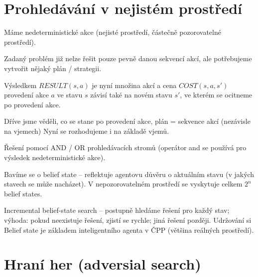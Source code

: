 
\section{Prohledávání v nejistém prostředí}

\begin{compactitem}
    \item Máme nedeterministické akce (nejisté prostředí, částečně pozorovatelné prostředí).

    \item Zadaný problém již nelze řešit pouze pevně danou sekvencí akcí, ale potřebujeme vytvořit nějaký plán / strategii.

    \item Výsledkem $RESULT(s, a)$ je nyní množina akcí a
    cena $COST(s, a, s')$ provedení akce $a$ ve stavu $s$ závisí také na novém stavu $s'$, ve kterém se ocitneme po provedení akce.

    \item Dříve jsme věděli, co se stane po provedení akce, plán = sekvence akcí (nezávisle na vjemech) Nyní se rozhodujeme i na základě vjemů.

    \item Řešení pomocí AND / OR prohledávacích stromů (operátor and se používá pro výsledek nedeterministické akce).

    \item Bavíme se o belief state -- reflektuje agentovu důvěru o aktuálním stavu (v jakých stavech se může nacházet). V nepozorovatelném prostředí se vyskytuje celkem $2^n$ belief states.

    \item Incremental belief-state search -- postupně hledáme řešení pro každý stav; výhoda: pokud neexistuje řešení, zjistí se rychle; jiná řešení později. Udržování si Belief state je základem inteligentního agenta v ČPP (většina reálných prostředí).
\end{compactitem}


\section{Hraní her (adversial search)}


